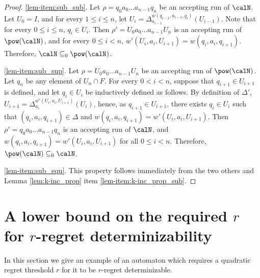 \documentclass[a4paper]{article}
\begin{document}
\begin{proof}
	\item \ref{lem-item:sub_sub}.
	Let $\rho = q_0 a_0 \dots a_{n-1} q_n$ be an accepting
	run of $\calN$.  Let $U_0 = I$, and for every $1 \leq i \leq n$,
	let $U_i =
	\Delta_{a_{i-1}}^{w(q_{i-1},a_{i-1},q_i)}(U_{i-1})$.  Note
	that for every $0 \leq i \leq n$, $q_i \in U_i$.  Then $\rho' = U_0
	a_0 \dots a_{n-1} U_n$ is an accepting run of $\pow(\calN)$,
	and for every $0 \leq i < n$, $w'(U_{i},a_i,U_{i+1}) =
	w(q_{i},a_i,q_{i+1})$.  Therefore, $\calN \subseteq_0 \pow(\calN)$.

	\item \ref{lem-item:sub_sup}.
	Let $\rho = U_0 a_0 \dots a_{n-1} U_n$ be an
	accepting run of $\pow(\calN)$. Let $q_n$ be any element of $U_n
	\cap F$. For every $0 < i < n$, suppose that $q_{i+1} \in U_{i+1}$ is defined, and let $q_i \in U_i$ be inductively defined
	as follows.  By definition of $\Delta'$, $U_{i+1} =
	\Delta_{a_{i}}^{w'(U_{i},a_{i},U_{i+1})}(U_{i})$, hence, as
	$q_{i+1} \in U_{i+1}$, there exists $q_{i} \in U_{i}$ such that
	$(q_{i},a_{i},q_{i+1}) \in \Delta$ and
	$w(q_{i},a_{i},q_{i+1}) = w'(U_{i},a_{i},U_{i+1})$.  Then $\rho'
	= q_0 a_0 \dots a_{n-1} q_n$ is an accepting run of $\calN$,
	and $w(q_{i},a_i,q_{i+1}) = w'(U_{i},a_i,U_{i+1})$ for all $0
	\le i < n$.  Therefore, $\pow(\calN) \subseteq_0 \calN$.

	\item \ref{lem-item:sub_equ}.
	This property follows immediately from the two others and Lemma
	\ref{lem:k-inc_prop} item \ref{lem-item:k-inc_prop_sub}.
\end{proof}

\section{A lower bound on the required $r$ for $r$-regret determinizability}
\label{sec:lower-bound-r}
In this section we give
an example of an automaton which requires a
quadratic regret threshold $r$ for it to be $r$-regret determinizable.
\end{document}
